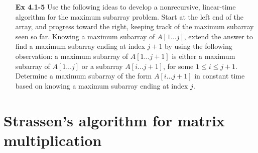 \documentclass[fontsize=12pt,paper=a4]{book}
\begin{document}
\begin{enumerate}
 \item[\textbf{Ex 4.1-5}]
       Use the following ideas to develop a nonrecursive, linear-time algorithm for the maximum subarray problem. Start at the left end of the array, and progress toward the right, keeping track of the maximum subarray seen so far. Knowing a maximum subarray of $A[1 \dots j]$, extend the answer to find a maximum subarray ending at index $j+1$ by using the following observation: a maximum subarray of $A[1 \dots j+1]$ is either a maximum subarray of $A[1 \dots j]$ or a subarray $A[i \dots j+1]$, for some $1 \leq i \leq j+1$. Determine a maximum subarray of the form $A[i \dots j+1]$ in constant time based on knowing a maximum subarray ending at index $j$.
\end{enumerate}

\section{Strassen’s algorithm for matrix multiplication}
\end{document}
